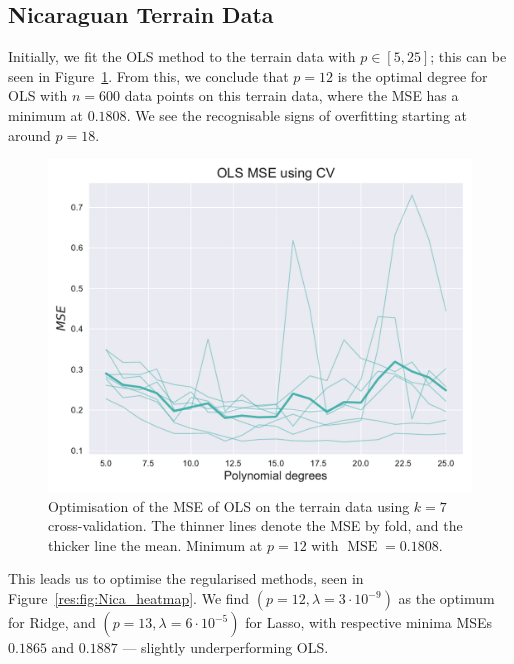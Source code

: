 \documentclass[twocolumn,english,notitlepage]{article}
\DeclareMathOperator{\mse}{MSE}
\begin{document}
    \subsection{Nicaraguan Terrain Data}
        Initially, we fit the OLS method to the terrain data with $p\in[5, 25]$; this can be seen in Figure~\ref{res:fig:Nica_OLS}. From this, we conclude that $p=12$ is the optimal degree for OLS with $n=600$ data points on this terrain data, where the MSE has a minimum at $0.1808$. We see the recognisable signs of overfitting starting at around $p=18$.
        \begin{figure} [ht]
            \centering
            \includegraphics[width=.9\linewidth]{OPT_OLS_mse_kfold.pdf}
            \caption{Optimisation of the MSE of OLS on the terrain data using $k=7$ cross-validation. The thinner lines denote the MSE by fold, and the thicker line the mean. Minimum at $p=12$ with $\mse = 0.1808$.}
            \label{res:fig:Nica_OLS}
        \end{figure}

        This leads us to optimise the regularised methods, seen in Figure~\ref{res:fig:Nica_heatmap}. We find $(p=12, \lambda = 3\cdot 10^{-9})$ as the optimum for Ridge, and $(p=13, \lambda=6 \cdot 10^{-5})$ for Lasso, with respective minima MSEs $0.1865$ and $0.1887$ --- slightly underperforming OLS.
    
\end{document}
